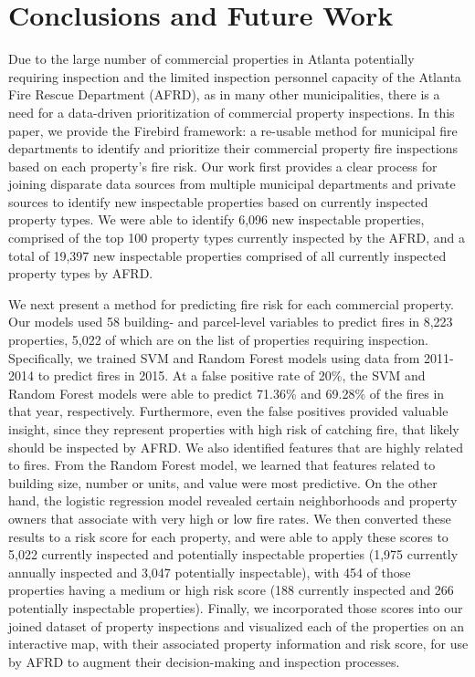 \documentclass{sig-alternate-05-2015}
\begin{document}
{\section{Conclusions and Future Work}
Due to the large number of commercial properties in Atlanta potentially requiring inspection and the limited inspection personnel capacity of the Atlanta Fire Rescue Department (AFRD), as in many other municipalities, there is a need for a data-driven prioritization of commercial property inspections. In this paper, we provide the Firebird framework: a re-usable method for municipal fire departments to identify and prioritize their commercial property fire inspections based on each property's fire risk. Our work first provides a clear process for joining disparate data sources from multiple municipal departments and private sources to identify new inspectable properties based on currently inspected property types. We were able to identify 6,096 new inspectable properties, comprised of the top 100 property types currently inspected by the AFRD, and a total of 19,397 new inspectable properties comprised of all currently inspected property types by AFRD. 

We next present a method for predicting fire risk for each commercial property. Our models used 58 building- and parcel-level variables to predict fires in 8,223 properties, 5,022 of which are on the list of properties requiring inspection. Specifically, we trained SVM and Random Forest models using data from 2011-2014 to predict fires in 2015. 
At a false positive rate of 20\%, the SVM and Random Forest models were able to predict 71.36\% and 69.28\% of the fires in that year, respectively. Furthermore, even the false positives provided valuable insight, since they represent properties with high risk of catching fire, that likely should be inspected by AFRD. We also identified features that are highly related to fires. From the Random Forest model, we learned that features related to building size, number or units, and value were most predictive. On the other hand, the logistic regression model revealed certain neighborhoods and property owners that associate with very high or low fire rates. We then converted these results to a risk score for each property, and were able to apply these scores to 5,022 currently inspected and potentially inspectable properties (1,975 currently annually inspected and 3,047 potentially inspectable), with 454 of those properties having a medium or high risk score (188 currently inspected and 266 potentially inspectable properties). Finally, we incorporated those scores into our joined dataset of property inspections and visualized each of the properties on an interactive map, with their associated property information and risk score, for use by AFRD to augment their decision-making and inspection processes. 

}
\end{document}
